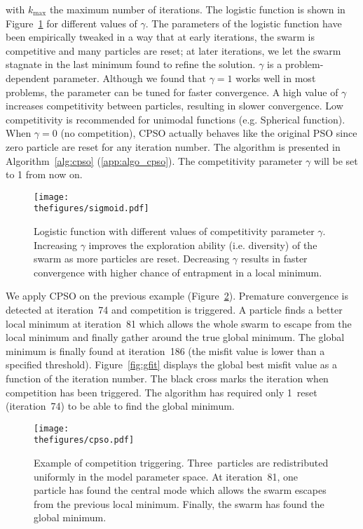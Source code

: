 \noindent with $k_{\max}$ the maximum number of iterations. The logistic function is shown in Figure~\ref{fig:logistic} for different values of $\gamma$. The parameters of the logistic function have been empirically tweaked in a way that at early iterations, the swarm is competitive and many particles are reset; at later iterations, we let the swarm stagnate in the last minimum found to refine the solution. $\gamma$ is a problem-dependent parameter. Although we found that $\gamma = 1$ works well in most problems, the parameter can be tuned for faster convergence. A high value of $\gamma$ increases competitivity between particles, resulting in slower convergence. Low competitivity is recommended for unimodal functions (e.g. Spherical function). When $\gamma = 0$ (no competition), CPSO actually behaves like the original PSO since zero particle are reset for any iteration number. The algorithm is presented in Algorithm~\ref{alg:cpso} (\ref{app:algo_cpso}). The competitivity parameter $\gamma$ will be set to 1 from now on.

\begin{figure}[!htbp]
	\centering
	\texttt{[image: \\thefigures/sigmoid.pdf]}
	\caption{Logistic function with different values of competitivity parameter $\gamma$. Increasing $\gamma$ improves the exploration ability (i.e. diversity) of the swarm as more particles are reset. Decreasing $\gamma$ results in faster convergence with higher chance of entrapment in a local minimum.}
	\label{fig:logistic}
\end{figure}

We apply CPSO on the previous example (Figure~\ref{fig:cpso}). Premature convergence is detected at iteration~74 and competition is triggered. A particle finds a better local minimum at iteration~81 which allows the whole swarm to escape from the local minimum and finally gather around the true global minimum. The global minimum is finally found at iteration~186 (the misfit value is lower than a specified threshold). Figure~\ref{fig:gfit} displays the global best misfit value as a function of the iteration number. The black cross marks the iteration when competition has been triggered. The algorithm has required only 1~reset (iteration~74) to be able to find the global minimum.

\begin{figure}[!htbp]
	\centering
	\texttt{[image: \\thefigures/cpso.pdf]}
    \caption{Example of competition triggering. Three~particles are redistributed uniformly in the model parameter space. At iteration~81, one particle has found the central mode which allows the swarm escapes from the previous local minimum. Finally, the swarm has found the global minimum.}
    \label{fig:cpso}
\end{figure}

